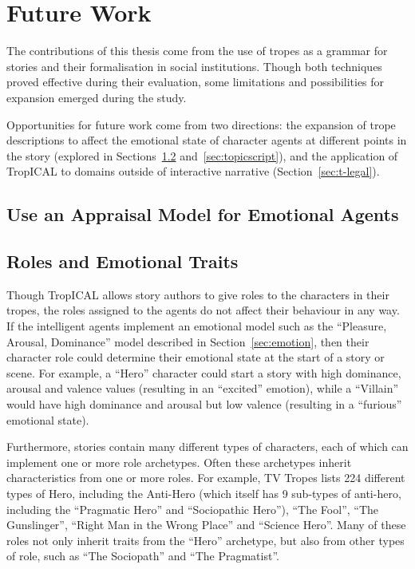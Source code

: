 \documentclass[11pt]{report}
\begin{document}
\section{Future Work}
\label{sec:future}

The contributions of this thesis come from the use of tropes as a grammar for
stories and their formalisation in social institutions. Though both techniques
proved effective during their evaluation, some limitations and possibilities for
expansion emerged during the study.

Opportunities for future work come from two directions: the expansion of trope
descriptions to affect the emotional state of character agents at different
points in the story (explored in Sections~\ref{sec:role-emotions}
and~\ref{sec:topicscript}), and the application of TropICAL to domains outside
of interactive narrative (Section~\ref{sec:t-legal}).

\subsection{Use an Appraisal Model for Emotional Agents}
\label{sec:future-emotion}

\subsection{Roles and Emotional Traits}
\label{sec:role-emotions}
Though TropICAL allows story authors to give roles to the characters in their
tropes, the roles assigned to the agents do not affect their behaviour in any
way. If the intelligent agents implement an emotional model such as the
``Pleasure, Arousal, Dominance''
model described in Section~\ref{sec:emotion}, then their character role could
determine their emotional state at the start of a story or scene. For example, a
``Hero'' character could start a story with high dominance, arousal and valence
values (resulting in an ``excited'' emotion), while a ``Villain'' would have
high dominance and arousal but low valence (resulting in a ``furious'' emotional
state).

Furthermore, stories contain many different types of characters, each of which can implement
one or more role archetypes. Often these archetypes inherit characteristics from
one or more roles. For example, TV Tropes lists 224 different types of Hero,
including the Anti-Hero (which itself has 9 sub-types of anti-hero, including
the ``Pragmatic Hero'' and ``Sociopathic Hero''), ``The Fool'', ``The
Gunslinger'', ``Right Man in the Wrong Place'' and ``Science Hero''. Many of
these roles not only inherit traits from the ``Hero'' archetype, but also from
other types of role, such as ``The Sociopath'' and ``The Pragmatist''.
\end{document}
